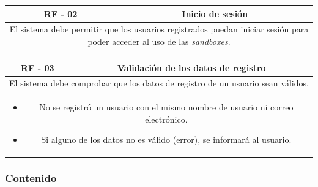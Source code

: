                 \begin{table}[!htbp]
                    \centering
                    \begin{tabular}{|c|c|}
                        \hline
                        \textbf{RF - 02} & \textbf{Inicio de sesión} \\
                        \hline
                        \multicolumn{2}{|p{15cm}|}{
                            El sistema debe permitir que los usuarios registrados puedan iniciar sesión para poder acceder al uso de las \textit{sandboxes}.
                        } \\
                        \hline
                    \end{tabular}
                    \label{tab:RF2}
                \end{table}
                
                \begin{table}[!htbp]
                    \centering
                    \begin{tabular}{|c|c|}
                        \hline
                        \textbf{RF - 03} & \textbf{Validación de los datos de registro} \\
                        \hline
                        \multicolumn{2}{|p{15cm}|}{
                            El sistema debe comprobar que los datos de registro de un usuario sean válidos.
                        } \\
                        \hline
                        \multicolumn{2}{|p{15cm}|}{
                            \begin{itemize}
                                \item No se registró un usuario con el mismo nombre de usuario ni correo electrónico.
                                \item Si alguno de los datos no es válido (error), se informará al usuario.
                            \end{itemize}
                            } \\
                        \hline
                    \end{tabular}
                    \label{tab:RF3}
                \end{table}
            
            
            \subsubsection{Contenido}
            
